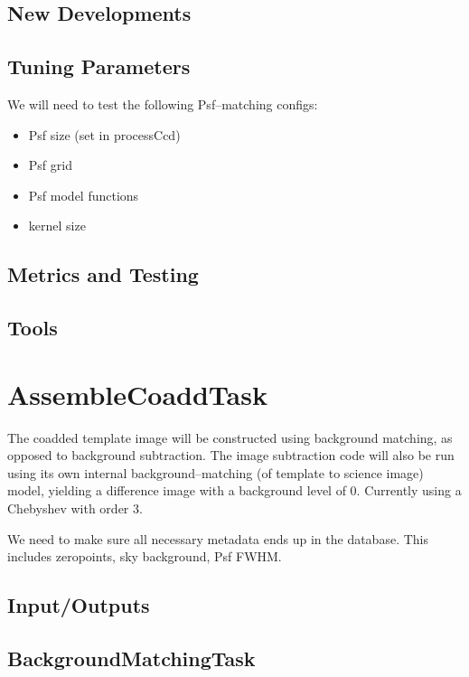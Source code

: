 \documentclass[12pt]{article}
\begin{document}
\subsection{New Developments}

\subsection{Tuning Parameters}
We will need to test the following Psf--matching configs:
\begin{itemize}
\item Psf size (set in processCcd)
\item Psf grid 
\item Psf model functions
\item kernel size
\end{itemize}

\subsection{Metrics and Testing}

\subsection{Tools}


\clearpage 
\section{AssembleCoaddTask} 

The coadded template image will be constructed using background
matching, as opposed to background subtraction.  The image subtraction
code will also be run using its own internal background--matching (of
template to science image) model, yielding a difference image with a
background level of 0.  Currently using a Chebyshev with order 3.

We need to make sure all necessary metadata ends up in the database.
This includes zeropoints, sky background, Psf FWHM.

\subsection{Input/Outputs}

\subsection{BackgroundMatchingTask} 
\end{document}
